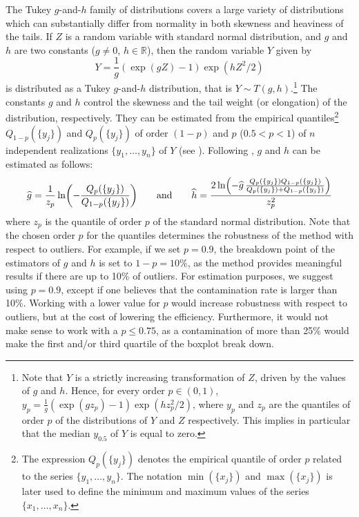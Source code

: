 The Tukey $g$-and-$h$ family of distributions covers a large variety of
distributions which can substantially differ from normality in both skewness
and heaviness of the tails. If $Z$ is a random variable with standard normal
distribution, and $g$ and $h$ are two constants ($g \neq 0$, $h \in
\mathbb{R}$), then the random variable $Y$ given by
\[
    Y = \frac{1}{g} \left(\exp(g Z) - 1\right) \exp(h Z^2/2)
\]
is distributed as a Tukey $g$-and-$h$ distribution, that is $Y \sim
T(g,h)$.\footnote{Note that $Y$ is a strictly increasing transformation of
$Z$, driven by the values of $g$ and $h$. Hence, for every order $p \in (0,
1)$, $y_p = \frac{1}{g} \left(\exp(g z_p) - 1\right) \exp(h z_p^2/2)$, where
$y_p$ and $z_p$ are the quantiles of order $p$ of the distributions of $Y$ and
$Z$ respectively. This implies in particular that the median $y_{0.5}$ of $Y$
is equal to zero.} The constants $g$ and $h$ control the skewness and the tail
weight (or elongation) of the distribution, respectively. They can be estimated
from the empirical quantiles\footnote{The expression $Q_p(\{y_j\})$ denotes the
empirical quantile of order $p$ related to the series $\{y_1, \dots, y_n\}$.
The notation $\min(\{x_j\})$ and $\max(\{x_j\})$ is later used to define the
minimum and maximum values of the series $\{x_1, \dots, x_n\}$.}                
$Q_{1-p}(\{y_j\}) $ and $Q_p(\{y_j\})$ of order $(1-p)$ and $p$ ($0.5 < p < 1$)
of $n$ independent realizations $\{y_1, \dots, y_n\}$ of $Y$ (see
\citealp{Jimenez:2011}). Following \citet{Jimenez:2011}, $g$ and $h$ can be
estimated as follows:
%
\begin{equation}\label{eq:ghat_hhat}
    \sthat{g} = \frac{1}{z_p} \ln\left(-\frac{Q_p(\{y_j\})}{Q_{1-p}(\{y_j\})}\right)
    \qquad\text{and}\qquad
    \sthat{h} = \frac{2\ln\left(-\sthat{g}\, \frac{Q_p(\{y_j\}) Q_{1-p}(\{y_j\})}
                {Q_p(\{y_j\}) + Q_{1-p}(\{y_j\})}\right)}{z_p^2}
\end{equation}
%
where $z_p$ is the quantile of order $p$ of the standard normal distribution.
Note that the chosen order $p$ for the quantiles determines the robustness of
the method with respect to outliers. For example, if we set $p = 0.9$, the
breakdown point of the estimators of $g$ and $h$ is set to $1 - p = 10\%$, as
the method provides meaningful results if there are up to 10\% of outliers. For
estimation purposes, we suggest using $p = 0.9$, except if one believes that
the contamination rate is larger than 10\%. Working with a lower value for $p$
would increase robustness with respect to outliers, but at the cost of lowering
the efficiency. Furthermore, it would not make sense to work with a $p \leq
0.75$, as a contamination of more than 25\% would make the first and/or third
quartile of the boxplot break down.

